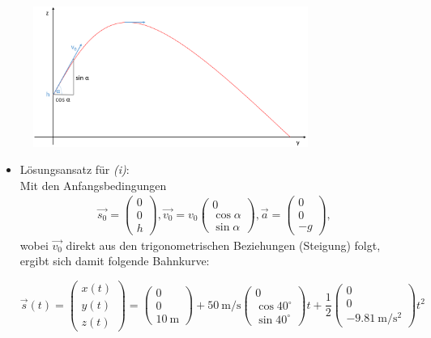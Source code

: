 \documentclass[a4paper, 12pt, onecolumn]{scrartcl}
\begin{document}
\begin{itemize}
    \begin{figure}[ht]
        \centering
            \includegraphics[width=0.8\textwidth]{flugbahn}
    \end{figure}
    
    
    \begin{itemize}
    \item Lösungsansatz für \emph{(i)}:\\
    Mit den Anfangsbedingungen
  \begin{align}
    \vec{s_0} = \begin{pmatrix} 0 \\ 0 \\ h \end{pmatrix},
    \vec{v_0} = v_0 \begin{pmatrix} 0 \\ \cos \alpha \\ \sin \alpha \end{pmatrix},
    \vec{a} = \begin{pmatrix} 0 \\ 0 \\ -g \end{pmatrix},
  \end{align}
    wobei $\vec{v_0}$ direkt aus den trigonometrischen Beziehungen (Steigung) folgt,
    ergibt sich damit folgende Bahnkurve:

  \begin{equation}
    \vec{s} (t) = \begin{pmatrix} x (t) \\ y (t) \\ z (t) \end{pmatrix} =  
    \begin{pmatrix} 0 \\ 0 \\ \SI{10}{\meter} \end{pmatrix} + 
    \SI{50}{\meter\per\second} \begin{pmatrix} 0 \\ \cos 40^\circ \\ \sin 40^\circ \end{pmatrix} t + 
    \frac{1}{2} \begin{pmatrix} 0 \\ 0 \\ \SI{-9.81}{\meter\per\square\second} \end{pmatrix} t^2
  \end{equation}


\end{itemize}
\end{itemize}
\end{document}
